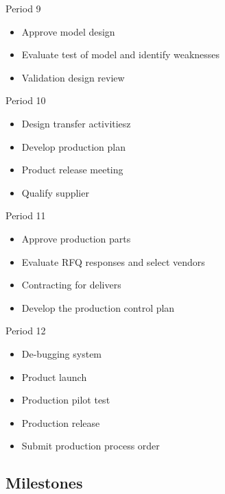 Period 9
\begin{itemize}
\item Approve model design
\item Evaluate test of model and identify weaknesses
\item Validation design review
\end{itemize}
Period 10
\begin{itemize}
\item Design transfer activitiesz
\item Develop production plan
\item Product release meeting
\item Qualify supplier
\end{itemize}
Period 11
\begin{itemize}
\item Approve production parts
\item Evaluate RFQ responses and select vendors
\item Contracting for delivers
\item Develop the production control plan
\end{itemize}
Period 12
\begin{itemize}
\item De-bugging system
\item Product launch
\item Production pilot test
\item Production release
\item Submit production process order
\end{itemize}

\subsection{Milestones}

